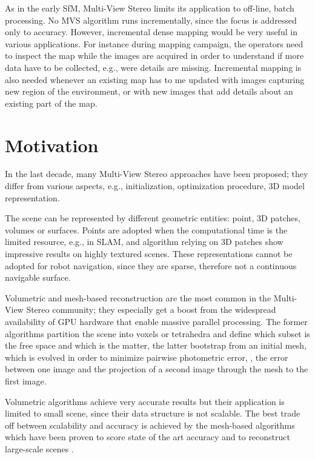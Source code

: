 As in the early SfM,  Multi-View Stereo limits its application to off-line, batch processing. No MVS algorithm runs incrementally, since the focus is addressed only to accuracy.
However, incremental dense mapping would be very useful in various applications. 
For instance during mapping campaign, the operators need to inspect the map while the images are  acquired in order to understand if more data have to be collected, e.g., were details are missing. 
Incremental mapping is also needed whenever an existing map has to me updated with images capturing new region of the environment, or with new images that add details about an existing part of the map.

\section{Motivation}
In the last decade, many Multi-View Stereo approaches have been proposed; they differ from various aspects, e.g., initialization, optimization procedure, 3D model representation.

The scene can be represented by different geometric entities: point, 3D patches, volumes or surfaces.
Points are adopted when the computational time is the limited resource, e.g., in SLAM, and algorithm relying on 3D patches show impressive results on highly textured scenes. 
These representations cannot be adopted for robot navigation, since they are sparse, therefore not a continuous navigable surface.

Volumetric and mesh-based reconstruction are the most common in the Multi-View Stereo community; they especially get a boost from the widespread availability of GPU hardware that enable massive parallel processing.
The former algorithms partition the scene into voxels or tetrahedra and define which subset is the free space and which is the matter, the latter bootstrap from an initial mesh, which is evolved in order to minimize pairwise photometric error, \ie, the error between one image and the projection of a second image through the mesh to the first image.

Volumetric algorithms achieve very accurate results but their application is limited to small scene, since their data structure is not scalable. 
The best trade off between scalability and accuracy is achieved by the mesh-based algorithms which have been proven to score state of the art accuracy \cite{li2015detail} and to reconstruct large-scale scenes \cite{vu_et_al_2012}.


